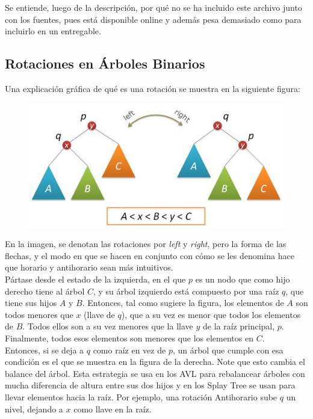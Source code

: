 \documentclass[12pt,letterpaper]{report}
\begin{document}
Se entiende, luego de la descripción, por qué no se ha incluido este archivo junto con los fuentes, pues está disponible online y además pesa demasiado como para incluirlo en un entregable.

\subsection{Rotaciones en Árboles Binarios}
\label{subsec:rotaciones}

Una explicación gráfica de qué es una rotación se muestra en la siguiente figura:

\begin{figure}[H]
\begin{center}
\includegraphics[scale=0.65]{rotaciones.jpg}
\end{center}
\end{figure}

En la imagen, se denotan las rotaciones por \emph{left} y \emph{right}, pero la forma de las flechas, y el modo en que se hacen en conjunto con cómo se les denomina hace que horario y antihorario sean más intuitivos.\\

Pártase desde el estado de la izquierda, en el que $p$ es un nodo que como hijo derecho tiene al árbol $C$, y su árbol izquierdo está compuesto por una raíz $q$, que tiene sus hijos $A$ y $B$. Entonces, tal como sugiere la figura, los elementos de $A$ son todos menores que $x$ (llave de $q$), que a su vez es menor que todos los elementos de $B$. Todos ellos son a su vez menores que la llave $y$ de la raíz principal, $p$. Finalmente, todos esos elementos son menores que los elementos en $C$.\\

Entonces, si se deja a $q$ como raíz en vez de $p$, un árbol que cumple con esa condición es el que se muestra en la figura de la derecha. Note que esto cambia el balance del árbol. Esta estrategia se usa en los AVL para rebalancear árboles con mucha diferencia de altura entre sus dos hijos y en los Splay Tree se usan para llevar elementos hacia la raíz. Por ejemplo, una rotación Antihorario sube $q$ un nivel, dejando a $x$ como llave en la raíz.\\
\end{document}

